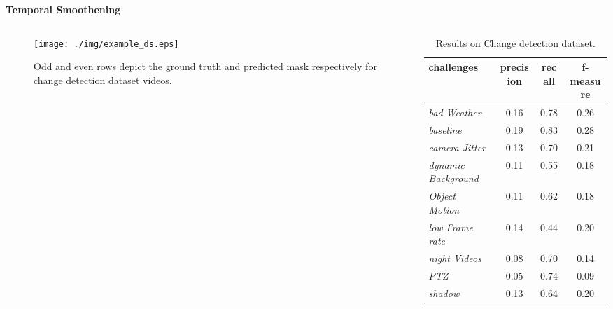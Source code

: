 \begin{frame}{\textbf{Temporal Smoothening}}
\begin{columns}
	\begin{column}{0.48\textwidth}
		\begin{figure}
			\centering
				\texttt{[image: ./img/example\_ds.eps]}
				\caption{Odd and even rows depict the ground truth and predicted mask respectively for change detection dataset videos.}
		\end{figure}
	\end{column}
	\begin{column}{0.48\textwidth}
	  \begin{table}[htbp]
   		\caption{Results on Change detection dataset\footnotemark.}
   		\begin{scriptsize} \begin{center}
   		\begin{tabular}{|l|c|c|c|} \hline
       		 \textbf{challenges} & \textbf{precision} & \textbf{recall} & \textbf{f-measure} \\ \hline
				\emph{bad Weather} & 0.16 & 0.78 & 0.26\\
				\emph{baseline} & 0.19 & {\color{yellow}0.83} & 0.28\\
				\emph{camera Jitter} & 0.13 & 0.70 & 0.21 \\
				\emph{dynamic Background} & 0.11 & 0.55 &  0.18\\
				\emph{Object Motion} & 0.11 & 0.62 & 0.18 \\
				\emph{low Frame rate} & 0.14 & 0.44 & 0.20 \\
				\emph{night Videos} & 0.08 & 0.70 & 0.14 \\
				\emph{PTZ }& 0.05 & 0.74 & 0.09\\
				\emph{shadow} & 0.13 & 0.64 & 0.20\\ \hline
 		\end{tabular} \end{center} \end{scriptsize}
 	 \end{table} 
	\end{column}
\end{columns}
\end{frame}

